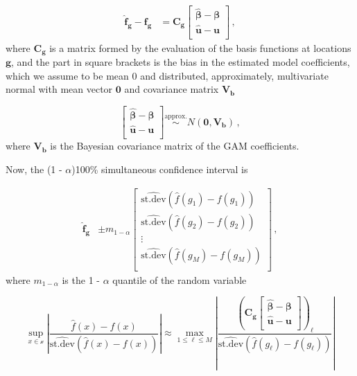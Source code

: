 \documentclass[12pt,]{article}
\begin{document}
\[
\begin{aligned}
    \hat{\mathbf{f}}_{\mathbf{g}} - \mathbf{f_g} &= \mathbf{C_g} \begin{bmatrix}
           \boldsymbol{\hat{\beta}} - \boldsymbol{\beta} \\
           \mathbf{\hat{u}} - \mathbf{u} \\
         \end{bmatrix}\, ,
\end{aligned}
\] where \(\mathbf{C_g}\) is a matrix formed by the evaluation of the
basis functions at locations \(\mathbf{g}\), and the part in square
brackets is the bias in the estimated model coefficients, which we
assume to be mean 0 and distributed, approximately, multivariate normal
with mean vector \(\mathbf{0}\) and covariance matrix \(\mathbf{V_b}\)

\[
\begin{bmatrix}
    \boldsymbol{\hat{\beta}} - \boldsymbol{\beta} \\
     \mathbf{\hat{u}} - \mathbf{u} \\
\end{bmatrix} \stackrel{\text{approx.}}{\sim} N \left (\mathbf{0}, \mathbf{V_b} \right )\, ,
\] where \(\mathbf{V_b}\) is the Bayesian covariance matrix of the GAM
coefficients.

Now, the (1 - \(\alpha\))100\% simultaneous confidence interval is

\[
\begin{aligned}
    \hat{\mathbf{f}}_{\mathbf{g}} &\pm m_{1 - \alpha} \begin{bmatrix}
           \widehat{\mathrm{st.dev}} (\hat{f}(g_1) - f(g_1)) \\
           \widehat{\mathrm{st.dev}} (\hat{f}(g_2) - f(g_2)) \\
           \vdots \\
           \widehat{\mathrm{st.dev}} (\hat{f}(g_M) - f(g_M)) \\
         \end{bmatrix}\, ,
\end{aligned}
\] where \(m_{1 - \alpha}\) is the 1 - \(\alpha\) quantile of the random
variable

\[
\sup_{x \in \mathcal{x}} \left | \frac{\hat{f}(x) - f(x)}{\widehat{\mathrm{st.dev}} (\hat{f}(x) - f(x))} \right | \approx \max_{1 \leq \ell \leq M} \left | \frac{\left ( \mathbf{C_g} \begin{bmatrix}
           \boldsymbol{\hat{\beta}} - \boldsymbol{\beta} \\
           \mathbf{\hat{u}} - \mathbf{u} \\
         \end{bmatrix} \right )_\ell}{\widehat{\mathrm{st.dev}} (\hat{f}(g_{\ell}) - f(g_{\ell}))} \right |
\]
\end{document}
